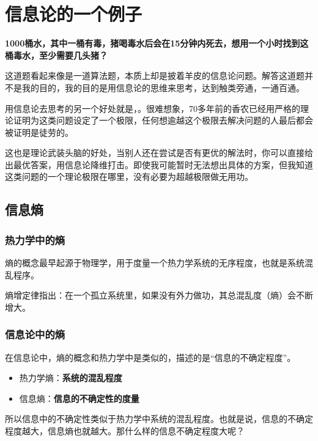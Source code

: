 \documentclass[12pt]{article}
\begin{document}

\section{信息论的一个例子\cite{InfomationTheory_Example_Poison}}
\textbf{1000桶水，其中一桶有毒，猪喝毒水后会在15分钟内死去，想用一个小时找到这桶毒水，至少需要几头猪？}

这道题看起来像是一道算法题，本质上却是披着羊皮的信息论问题。解答这道题并不是我的目的，我的目的是用信息论的思维来思考，达到触类旁通，一通百通。

用信息论去思考的另一个好处就是，{\color{red}{信息论给了这类问题的一个边界，让我们在边界范围内思考问题}}。很难想象，70多年前的香农已经用严格的理论证明为这类问题设定了一个极限，任何想逾越这个极限去解决问题的人最后都会被证明是徒劳的。

这也是理论武装头脑的好处，当别人还在尝试是否有更优的解法时，你可以直接给出最优答案，用信息论降维打击。即使我可能暂时无法想出具体的方案，但我知道这类问题的一个理论极限在哪里，没有必要为超越极限做无用功。

\subsection{信息熵}
\subsubsection{热力学中的熵}
熵的概念最早起源于物理学，用于度量一个热力学系统的无序程度，也就是系统混乱程序。

熵增定律指出：在一个孤立系统里，如果没有外力做功，其总混乱度（熵）会不断增大。

\subsubsection{信息论中的熵}
在信息论中，熵的概念和热力学中是类似的，描述的是“信息的不确定程度”。

\begin{itemize}[itemindent=2em]
    \item 热力学熵：\textbf{系统的混乱程度}
    
    \item 信息熵：\textbf{信息的不确定性的度量}
\end{itemize}

所以信息中的不确定性类似于热力学中系统的混乱程度。也就是说，信息的不确定程度越大，信息熵也就越大。那什么样的信息不确定程度大呢？
\end{document}

